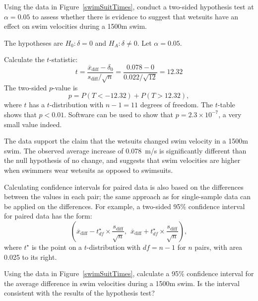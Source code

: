 \begin{examplewrap}
\begin{nexample}{Using the data in Figure~\ref{swimSuitTimes}, conduct a two-sided hypothesis test at $\alpha = 0.05$ to assess whether there is evidence to suggest that wetsuits have an effect on swim velocities during a 1500m swim.}

The hypotheses are $H_0: \delta = 0$ and $H_A: \delta \neq 0$. Let $\alpha = 0.05$. 

Calculate the $t$-statistic:
\[t = \frac{\overline{x}_{\text{diff}} - \delta_0} {s_{\text{diff}}/\sqrt{n}} = \frac{0.078 - 0}{0.022/\sqrt{12}} = 12.32\]
The two-sided $p$-value is
$$ p = P(T < -\text{12.32}) + P(T > \text{12.32}), $$
where $t$ has a $t$-distribution with $n-1 = 11$  degrees of freedom.
The $t$-table shows that $p < 0.01$. Software can be used to show that $p = 2.3 \times 10^{-7}$, a very small value indeed.  
	
The data support the claim that the wetsuits changed swim velocity in a 1500m swim. The observed average increase of 0.078~m/s is significantly different than the null hypothesis of no change, and suggests that swim velocities are higher when swimmers wear wetsuits as opposed to swimsuits.	
\end{nexample}
\end{examplewrap}


Calculating confidence intervals for paired data is also based on the differences between the values in each pair; the same approach as for single-sample data can be applied on the differences. For example, a two-sided 95\% confidence interval for paired data has the form:
\[ \left(
  \overline{x}_{\text{diff}} - t^\star_{df} \times \frac{s_{\text{diff}}}{\sqrt{n}},
  \:\: \overline{x}_{\text{diff}} + t^\star_{df} \times \frac{s_{\text{diff}}}{\sqrt{n}} \right), 
\]
where $t^\star$ is the point on a $t$-distribution with $df = n - 1$ for $n$ pairs, with area 0.025 to its right.

\textD{\newpage}

\begin{exercisewrap}
\begin{nexercise} 
Using the data in Figure~\ref{swimSuitTimes}, calculate a 95\% confidence interval for the average difference in swim velocities during a 1500m swim. Is the interval consistent with the results of the hypothesis test?\footnotemark{}
\end{nexercise}
\end{exercisewrap}

